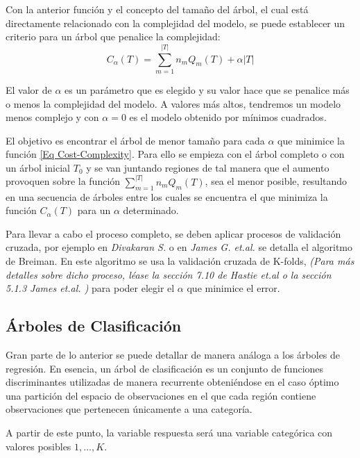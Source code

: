 \noindent Con la anterior función y el concepto del tamaño del árbol, el cual está directamente relacionado con la complejidad del modelo, se puede establecer un criterio para un árbol que penalice la complejidad:
\begin{equation} \label{Eq Cost-Complexity}
C_{\alpha}(T)=\sum_{m=1}^{|T|}n_m Q_m(T) + \alpha|T|
\end{equation}

\noindent El valor de $\alpha$ es un parámetro que es elegido y su valor hace que se penalice más o menos la complejidad del modelo. A valores más altos, tendremos un modelo menos complejo y con $\alpha = 0$ es el modelo obtenido por mínimos cuadrados.

\noindent El objetivo es encontrar el árbol de menor tamaño para cada $\alpha$ que minimice la función \eqref{Eq Cost-Complexity}. Para ello se empieza con el árbol completo o con un árbol inicial $T_0$ y se van juntando regiones de tal manera que el aumento provoquen sobre la función $\sum_{m=1}^{|T|}n_m Q_m(T)$, sea el menor posible, resultando en una secuencia de árboles entre los cuales se encuentra el que minimiza la función $C_{\alpha}(T)$ para un $\alpha $ determinado. 

\noindent Para llevar a cabo el proceso completo, se deben aplicar procesos de validación cruzada, por ejemplo  en \textit{Divakaran S.}\cite{Divakaran 2022} o en \textit{James G. et.al.} \cite{James 2013} se detalla el algoritmo de Breiman. En este algoritmo se  usa la validación cruzada de K-folds, \textit{(Para más detalles sobre dicho proceso, léase la sección 7.10 de Hastie et.al \cite{Hastie 2001} o la sección 5.1.3 James et.al. \cite{James 2013})} para poder elegir el $\alpha$ que minimice el error.

\subsection{Árboles de Clasificación}
\noindent Gran parte de lo anterior se puede detallar de manera análoga a los árboles de regresión. En esencia, un árbol de clasificación es un conjunto de funciones discriminantes utilizadas de manera recurrente obteniéndose en el caso óptimo una partición del espacio de observaciones en el que cada región contiene observaciones que pertenecen únicamente a una categoría.



\noindent A partir de este punto, la variable respuesta será una variable categórica con valores posibles $1,\ldots, K$.

